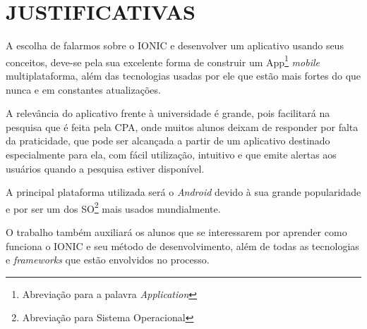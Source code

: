 \chapter{JUSTIFICATIVAS}

	\par A escolha de falarmos sobre o IONIC e desenvolver um aplicativo usando seus conceitos, deve-se pela sua excelente forma de construir um App\footnote{Abreviação para a palavra \textit{Application}} \textit{mobile} multiplataforma, além das tecnologias usadas por ele que estão mais fortes do que nunca e em constantes atualizações.
	\par A relevância do aplicativo frente à universidade é grande, pois facilitará na pesquisa que é feita pela CPA, onde muitos alunos deixam de responder por falta da praticidade, que pode ser alcançada a partir de um aplicativo destinado especialmente para ela, com fácil utilização, intuitivo e que emite alertas aos usuários quando a pesquisa estiver disponível.
	\par A principal plataforma utilizada será o \textit{Android} devido à sua grande popularidade e por ser um dos SO\footnote{Abreviação para Sistema Operacional} mais usados mundialmente.
	\par O trabalho também auxiliará os alunos que se interessarem por aprender como funciona o IONIC e seu método de desenvolvimento, além de todas as tecnologias e \textit{frameworks} que estão envolvidos no processo.
	